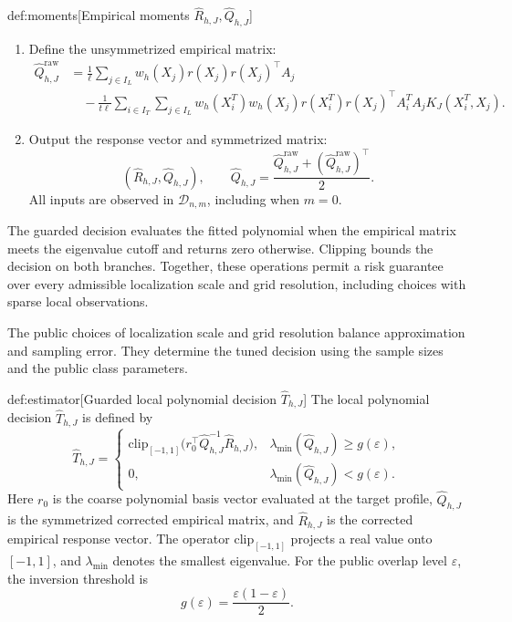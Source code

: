 \begin{algorithmv}{def:moments}[Empirical moments \(\widehat R_{h,J},\widehat Q_{h,J}\)]
\begin{enumerate}
\[\begin{aligned}
K_J(X_i^T,X_j)Y_j.
\end{aligned}
\]
The response factor in the rectangular correction is \(Y_j\), and the first summand uses \(A_jY_j\). The nested and rectangular expressions define the same vector.
\item Define the unsymmetrized empirical matrix:
\[
\begin{aligned}
\widehat Q^{\mathrm{raw}}_{h,J}
&=\frac1\ell\sum_{j\in I_L}w_h(X_j)r(X_j)r(X_j)^\top A_j\\
&\quad-\frac1{t\ell}\sum_{i\in I_T}\sum_{j\in I_L}
w_h(X_i^T)w_h(X_j)r(X_i^T)r(X_j)^\top
A_i^TA_jK_J(X_i^T,X_j).
\end{aligned}
\]
\item Output the response vector and symmetrized matrix:
\[
\left(\widehat R_{h,J},\widehat Q_{h,J}\right),
\qquad
\widehat Q_{h,J}
=\frac{\widehat Q^{\mathrm{raw}}_{h,J}
+(\widehat Q^{\mathrm{raw}}_{h,J})^\top}{2}.
\]
All inputs are observed in \(\mathcal D_{n,m}\), including when \(m=0\).
\end{enumerate}
\end{algorithmv}

The guarded decision  evaluates the fitted polynomial when the empirical matrix meets the eigenvalue cutoff and returns zero otherwise. Clipping bounds the decision on both branches. Together, these operations permit a risk guarantee over every admissible localization scale and grid resolution, including choices with sparse local observations.

The public choices of localization scale  and grid resolution  balance approximation and sampling error. They determine the tuned decision  using the sample sizes and the public class parameters.

\begin{definitionv}{def:estimator}[Guarded local polynomial decision \(\widehat T_{h,J}\)]
The local polynomial decision \(\widehat T_{h,J}\) is defined by
\[
\widehat T_{h,J}=
\begin{cases}
\mathrm{clip}_{[-1,1]}
\bigl(r_0^\top\widehat Q_{h,J}^{-1}\widehat R_{h,J}\bigr),
&\lambda_{\min}(\widehat Q_{h,J})\ge g(\varepsilon),\\
0,
&\lambda_{\min}(\widehat Q_{h,J})<g(\varepsilon).
\end{cases}
\]
Here \(r_0\) is the coarse polynomial basis vector evaluated at the target profile, \(\widehat Q_{h,J}\) is the symmetrized corrected empirical matrix, and \(\widehat R_{h,J}\) is the corrected empirical response vector. The operator \(\mathrm{clip}_{[-1,1]}\) projects a real value onto \([-1,1]\), and \(\lambda_{\min}\) denotes the smallest eigenvalue. For the public overlap level \(\varepsilon\), the inversion threshold is
\[
g(\varepsilon)=\frac{\varepsilon(1-\varepsilon)}{2}.
\]
\end{definitionv}

